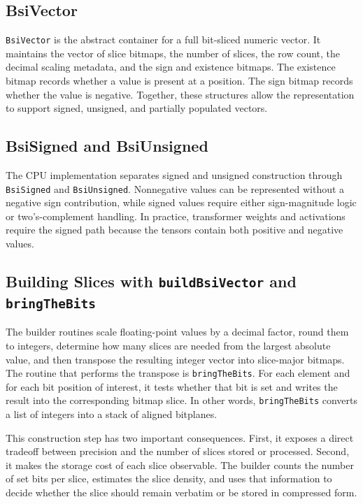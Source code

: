 \subsection{BsiVector}
\texttt{BsiVector} is the abstract container for a full bit-sliced numeric vector. It maintains the vector of slice bitmaps, the number of slices, the row count, the decimal scaling metadata, and the sign and existence bitmaps. The existence bitmap records whether a value is present at a position. The sign bitmap records whether the value is negative. Together, these structures allow the representation to support signed, unsigned, and partially populated vectors.

\subsection{BsiSigned and BsiUnsigned}
The CPU implementation separates signed and unsigned construction through \texttt{BsiSigned} and \texttt{BsiUnsigned}. Nonnegative values can be represented without a negative sign contribution, while signed values require either sign-magnitude logic or two's-complement handling. In practice, transformer weights and activations require the signed path because the tensors contain both positive and negative values.

\subsection{Building Slices with \texttt{buildBsiVector} and \texttt{bringTheBits}}
The builder routines scale floating-point values by a decimal factor, round them to integers, determine how many slices are needed from the largest absolute value, and then transpose the resulting integer vector into slice-major bitmaps. The routine that performs the transpose is \texttt{bringTheBits}. For each element and for each bit position of interest, it tests whether that bit is set and writes the result into the corresponding bitmap slice. In other words, \texttt{bringTheBits} converts a list of integers into a stack of aligned bitplanes.

This construction step has two important consequences. First, it exposes a direct tradeoff between precision and the number of slices stored or processed. Second, it makes the storage cost of each slice observable. The builder counts the number of set bits per slice, estimates the slice density, and uses that information to decide whether the slice should remain verbatim or be stored in compressed form.

